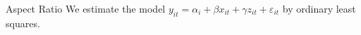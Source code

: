 \documentclass{beamer}
\begin{document}
\begin{frame}{Aspect Ratio}
  We estimate the model $y_{it} = \alpha_i + \beta x_{it} + \gamma z_{it} + \varepsilon_{it}$ by ordinary least squares.
\end{frame}
\end{document}
